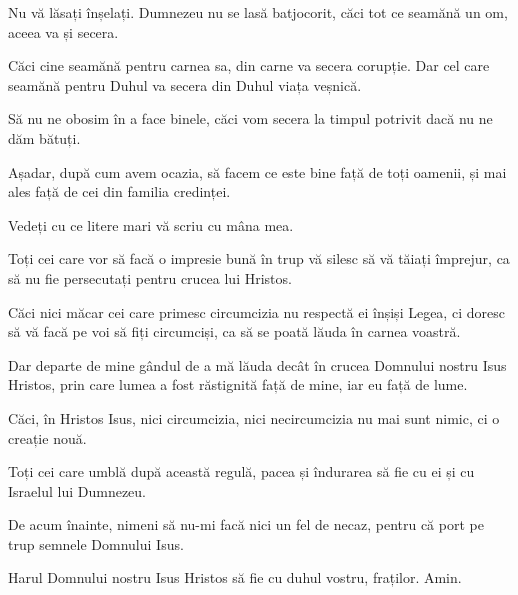 {\par }{\PP {}Nu vă lăsați înșelați. Dumnezeu nu se lasă batjocorit, căci tot ce seamănă un om, aceea va și secera.

Căci cine seamănă pentru carnea sa, din carne va secera corupție. Dar cel care seamănă pentru Duhul va secera din Duhul viața veșnică.

Să nu ne obosim în a face binele, căci vom secera la timpul potrivit dacă nu ne dăm bătuți.

Așadar, după cum avem ocazia, să facem ce este bine față de toți oamenii, și mai ales față de cei din familia credinței.


\par }{\PP {}Vedeți cu ce litere mari vă scriu cu mâna mea.

Toți cei care vor să facă o impresie bună în trup vă silesc să vă tăiați împrejur, ca să nu fie persecutați pentru crucea lui Hristos.

Căci nici măcar cei care primesc circumcizia nu respectă ei înșiși Legea, ci doresc să vă facă pe voi să fiți circumciși, ca să se poată lăuda în carnea voastră.

Dar departe de mine gândul de a mă lăuda decât în crucea Domnului nostru Isus Hristos, prin care lumea a fost răstignită față de mine, iar eu față de lume.

Căci, în Hristos Isus, nici circumcizia, nici necircumcizia nu mai sunt nimic, ci o creație nouă.

Toți cei care umblă după această regulă, pacea și îndurarea să fie cu ei și cu Israelul lui Dumnezeu.


\par }{\PP {}De acum înainte, nimeni să nu-mi facă nici un fel de necaz, pentru că port pe trup semnele Domnului Isus.


\par }{\PP {}Harul Domnului nostru Isus Hristos să fie cu duhul vostru, fraților. Amin.


\par }